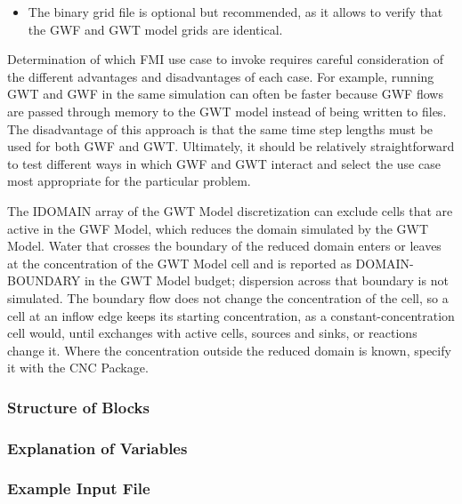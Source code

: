 \begin{itemize}
\begin{itemize}
\item The binary grid file is optional but recommended, as it allows \mf to verify that the GWF and GWT model grids are identical.
\end{itemize}

\end{itemize}

\noindent Determination of which FMI use case to invoke requires careful consideration of the different advantages and disadvantages of each case.  For example, running GWT and GWF in the same simulation can often be faster because GWF flows are passed through memory to the GWT model instead of being written to files.  The disadvantage of this approach is that the same time step lengths must be used for both GWF and GWT.  Ultimately, it should be relatively straightforward to test different ways in which GWF and GWT interact and select the use case most appropriate for the particular problem. 

\noindent The IDOMAIN array of the GWT Model discretization can exclude cells that are active in the GWF Model, which reduces the domain simulated by the GWT Model. Water that crosses the boundary of the reduced domain enters or leaves at the concentration of the GWT Model cell and is reported as DOMAIN-BOUNDARY in the GWT Model budget; dispersion across that boundary is not simulated. The boundary flow does not change the concentration of the cell, so a cell at an inflow edge keeps its starting concentration, as a constant-concentration cell would, until exchanges with active cells, sources and sinks, or reactions change it. Where the concentration outside the reduced domain is known, specify it with the CNC Package.

\vspace{5mm}
\subsubsection{Structure of Blocks}



\vspace{5mm}
\subsubsection{Explanation of Variables}
\begin{description}

\end{description}

\vspace{5mm}
\subsubsection{Example Input File}


